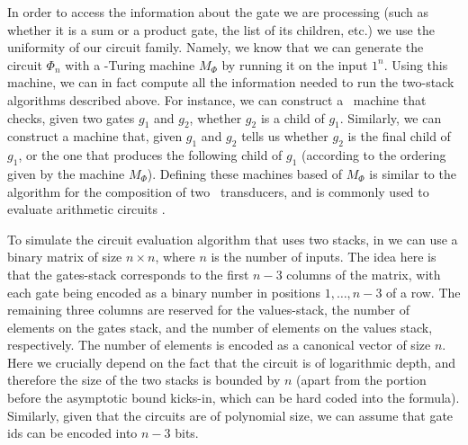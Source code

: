 In order  to access the information about the gate we are processing (such as whether it is a sum or a product gate, the list of its children, etc.) we use the uniformity of our circuit family. Namely, we know that we can generate the circuit $\Phi_n$ with a \logspace-Turing machine $M_\Phi$ by running it on the input $1^n$. Using this machine, we can in fact compute all the information needed to run the two-stack algorithms described above. For instance, we can construct a \logspace\ machine that checks, given two gates $g_1$ and $g_2$, whether $g_2$ is a child of $g_1$. Similarly, we can construct a machine that, given $g_1$ and $g_2$ tells us whether $g_2$ is the final child of $g_1$, or the one that produces the following child of $g_1$ (according to the ordering given by the machine $M_\Phi$). Defining these machines based of $M_\Phi$ is similar to the algorithm for the composition of two \logspace\ transducers, and is commonly used to evaluate arithmetic circuits \citep{allender}. %


To simulate the circuit evaluation algorithm that uses two stacks, in \langfor we can use a binary matrix of size $n\times n$, where $n$ is the number of inputs. The idea here is that  the gates-stack corresponds to the first $n-3$ columns of the matrix, with each gate being encoded as a binary number in positions $1,\ldots,n-3$ of a row. The remaining three columns are reserved for the values-stack, the number of elements on the gates stack, and the number of elements on the values stack, respectively. The number of elements is encoded as a canonical vector of size $n$. Here we crucially depend on the fact that the circuit is of logarithmic depth, and therefore the size of the two stacks is bounded by $n$ (apart from the portion before the asymptotic bound kicks-in, which can be hard coded into the formula). Similarly, given that the circuits are of polynomial size, we can assume that gate ids can be encoded into $n-3$ bits.

